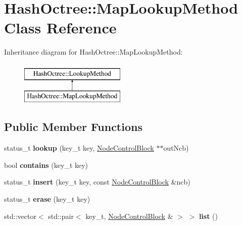 \hypertarget{class_hash_octree_1_1_map_lookup_method}{}\section{Hash\+Octree\+::Map\+Lookup\+Method Class Reference}
\label{class_hash_octree_1_1_map_lookup_method}
Inheritance diagram for Hash\+Octree\+::Map\+Lookup\+Method\+:\begin{figure}[H]
\begin{center}
\leavevmode
\includegraphics[height=2.000000cm]{class_hash_octree_1_1_map_lookup_method}
\end{center}
\end{figure}
\subsection*{Public Member Functions}
\begin{DoxyCompactItemize}
\item 
\mbox{\label{class_hash_octree_1_1_map_lookup_method_ab14bbb1eeb0fe61930edcb1c7c17fad2}} 
status\+\_\+t {\bfseries lookup} (key\+\_\+t key, \mbox{\hyperlink{class_hash_octree_1_1_node_control_block}{Node\+Control\+Block}} $\ast$$\ast$out\+Ncb)
\item 
\mbox{\label{class_hash_octree_1_1_map_lookup_method_afef7db4847b23a81137afa921915ffa0}} 
bool {\bfseries contains} (key\+\_\+t key)
\item 
\mbox{\label{class_hash_octree_1_1_map_lookup_method_a7c1affe588c7184187cda80e144a673e}} 
status\+\_\+t {\bfseries insert} (key\+\_\+t key, const \mbox{\hyperlink{class_hash_octree_1_1_node_control_block}{Node\+Control\+Block}} \&ncb)
\item 
\mbox{\label{class_hash_octree_1_1_map_lookup_method_a85d2d28c9a3bb0ba5e75fd7d18890d67}} 
status\+\_\+t {\bfseries erase} (key\+\_\+t key)
\item 
\mbox{\label{class_hash_octree_1_1_map_lookup_method_adf3471a4f1114b6304026391cd6ae7ec}} 
std\+::vector$<$ std\+::pair$<$ key\+\_\+t, \mbox{\hyperlink{class_hash_octree_1_1_node_control_block}{Node\+Control\+Block}} \& $>$ $>$ {\bfseries list} ()
\end{DoxyCompactItemize}


